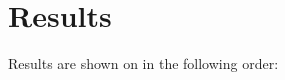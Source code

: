 \documentclass{vldb}
\begin{document}
%


%


\section{Results}
Results are shown on in the following order:

\end{document}
